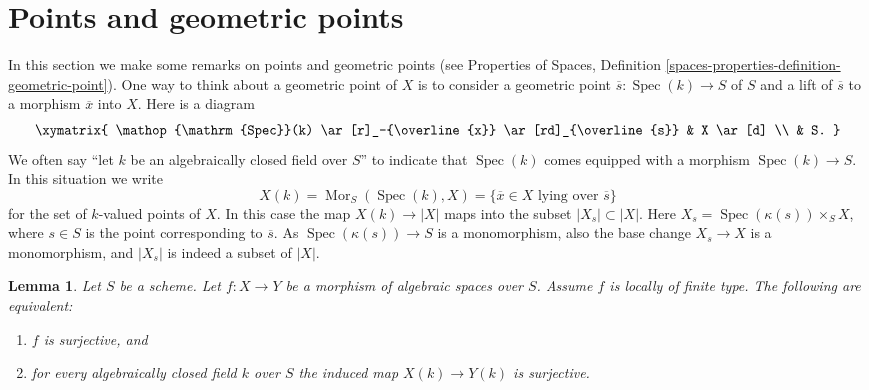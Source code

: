 \documentclass{stacks-project}
\theoremstyle{plain}
\newtheorem{lemma}[subsection]{Lemma}
\theoremstyle{definition}
\theoremstyle{remark}
\numberwithin{equation}{subsection}
\def\Spec{\mathop{\mathrm{Spec}}}
\def\Mor{\mathop{\mathrm{Mor}}\nolimits}
\begin{document}
\section{Points and geometric points}
\label{section-points-fields}

\noindent
In this section we make some remarks on points and geometric points (see
Properties of Spaces,
Definition \ref{spaces-properties-definition-geometric-point}).
One way to think about a geometric point of $X$ is to
consider a geometric point $\overline{s} : \Spec(k) \to S$ of $S$
and a lift of $\overline{s}$ to a morphism $\overline{x}$ into $X$.
Here is a diagram
$$
\xymatrix{
\Spec(k) \ar[r]_-{\overline{x}} \ar[rd]_{\overline{s}} & X \ar[d] \\
& S.
}
$$
We often say ``let $k$ be an algebraically closed field over $S$''
to indicate that $\Spec(k)$ comes equipped with a morphism
$\Spec(k) \to S$. In this situation we write
$$
X(k) = \Mor_S(\Spec(k), X) =
\{\overline{x} \in X\text{ lying over }\overline{s}\}
$$
for the set of $k$-valued points of $X$. In this case the map
$X(k) \to |X|$ maps into the subset $|X_s| \subset |X|$.
Here $X_s = \Spec(\kappa(s)) \times_S X$, where $s \in S$
is the point corresponding to $\overline{s}$. As
$\Spec(\kappa(s)) \to S$ is a monomorphism, also the base change
$X_s \to X$ is a monomorphism, and $|X_s|$ is indeed a subset of $|X|$.

\begin{lemma}
\label{lemma-locally-finite-type-surjective-geometric-points}
Let $S$ be a scheme. Let $f : X \to Y$ be a morphism of algebraic spaces
over $S$. Assume $f$ is locally of finite type. The following are equivalent:
\begin{enumerate}
\item $f$ is surjective, and
\item for every algebraically closed field $k$ over $S$ the induced
map $X(k) \to Y(k)$ is surjective.
\end{enumerate}
\end{lemma}
\end{document}
